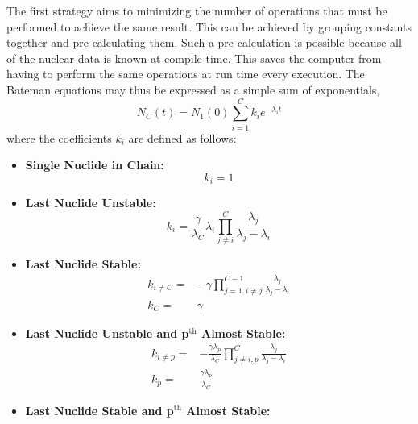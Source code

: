 \documentclass[letterpaper]{physor2018}
\newcommand{\pth}{p$^{\mathrm{th}}$\xspace}
\begin{document}
The first strategy aims to minimizing the number of
operations that must be performed to achieve the same result. This can be achieved
by grouping constants together and pre-calculating them. Such a pre-calculation is possible
because all of the nuclear data is known at compile time. This saves the computer from
having to perform the same operations at run time every execution.
The Bateman equations may thus be expressed as a simple sum of exponentials,
\begin{equation}
\label{sum-of-exp}
    N_C(t) = N_1(0) \sum_{i=1}^C k_{i} e^{-\lambda_i t}
\end{equation}
where the coefficients $k_i$ are defined as follows:
\begin{itemize}
\item \textbf{Single Nuclide in Chain:}
\begin{equation}
\label{k-single}
    k_i = 1
\end{equation}
\item \textbf{Last Nuclide Unstable:}
\begin{equation}
\label{k-last-unstable}
    k_i = \frac{\gamma}{\lambda_C} \lambda_i \prod_{j\ne i}^C \frac{\lambda_j}{\lambda_j - \lambda_i}
\end{equation}
\item \textbf{Last Nuclide Stable:}
\begin{equation}
\label{k-last-stable-0}
\begin{split}
    k_{i\ne C} = & -\gamma \prod_{j=1,i\ne j}^{C-1} \frac{\lambda_j}{\lambda_j - \lambda_i} \\
    k_C = & \gamma
\end{split}
\end{equation}
\item \textbf{Last Nuclide Unstable and \pth Almost Stable:}
\begin{equation}
\label{k-last-unstable-p-almost-stable-0}
\begin{split}
    k_{i\ne p} = & -\frac{\gamma\lambda_p}{\lambda_C} \prod_{j\ne i,p}^C \frac{\lambda_j}{\lambda_j - \lambda_i} \\
    k_p = & \frac{\gamma\lambda_p}{\lambda_C}
\end{split}
\end{equation}
\item \textbf{Last Nuclide Stable and \pth Almost Stable:}
\begin{equation}
\label{k-last-stable-p-almost-stable-0}
\end{equation}
\begin{equation}

\end{equation}
\end{itemize}
\end{document}
